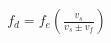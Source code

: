 \documentclass[preview]{standalone}
\begin{document}
\begin{align*}
f_d =f_e \left(\frac{v_s}{v_s \pm  v_f}\right)
\end{align*}
\end{document}
